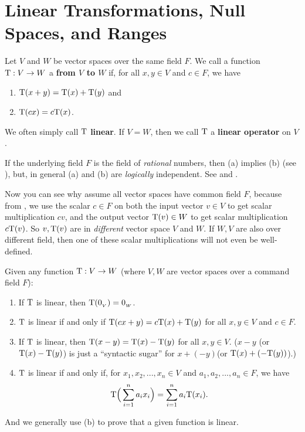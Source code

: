 \section{Linear Transformations, Null Spaces, and Ranges} \label{sec 2.1}

\begin{definition} \label{def 2.1}
Let \(V\) and \(W\) be vector spaces over the same field \(F\).
We call a function \(\mathrm{T}: V \to W\) a \textbf{\LTRAN{} from \(V\) to \(W\)} if, for all \(x, y \in V\) and \(c \in F\), we have
\begin{enumerate}
\item \(\mathrm{T}(x + y) = \mathrm{T}(x) + \mathrm{T}(y)\) and
\item \(\mathrm{T}(cx) = c\mathrm{T}(x)\).
\end{enumerate}
We often simply call \(\mathrm{T}\) \textbf{linear}.
If \(V = W\), then we call \(\mathrm{T}\) a \textbf{linear operator} on \(V\).
\end{definition}

\begin{remark} \label{remark 2.1.1}
If the underlying field \(F\) is the field of \emph{rational} numbers, then  (a) implies (b) (see ),
but, in general (a) and (b) are \emph{logically} independent.
See  and .
\end{remark}

\begin{remark} \label{remark 2.1.2}
Now you can see why  assume all vector spaces have common field \(F\), because from , we use the scalar \(c \in F\) on both the input vector \(v \in V\) to get scalar multiplication \(c v\), and the output vector \(\mathrm{T}(v) \in W\) to get scalar multiplication \(c \mathrm{T}(v)\).
So \(v, \mathrm{T}(v)\) are in \emph{different} vector space \(V\) and \(W\).
If \(W, V\) are also over different field, then one of these scalar multiplications will not even be well-defined.
\end{remark}

\begin{additional theorem} \label{athm 2.1}
Given any function \(\mathrm{T} : V \to W\) (where \(V, W\) are vector spaces over a command field \(F\)):
\begin{enumerate}
\item If \(\mathrm{T}\) is linear, then \(\mathrm{T}(0_{_V}) = 0_{_W}\).
\item \(\mathrm{T}\) is linear if and only if \(\mathrm{T}(cx + y) = c\mathrm{T}(x) + \mathrm{T}(y)\) for all \(x, y \in V\) and \(c \in F\).
\item If \(\mathrm{T}\) is linear, then \(\mathrm{T}(x - y) = \mathrm{T}(x) - \mathrm{T}(y)\) for all \(x, y \in V\).
    (\(x - y\) (or \(\mathrm{T}(x) - \mathrm{T}(y)\)) is just a ``syntactic sugar'' for \(x + (-y)\)(or \(\mathrm{T}(x) + (-\mathrm{T}(y))\)).)
\item \(\mathrm{T}\) is linear if and only if, for \(x_1, x_2, ..., x_n \in V\) and \(a_1, a_2, ..., a_n \in F\), we have
\[
    \mathrm{T} \Big( \sum_{i = 1}^{n} a_i x_i \Big) = \sum_{i = 1}^{n} a_i \mathrm{T}(x_i).
\]
\end{enumerate}
And we generally use (b) to prove that a given function is linear.
\end{additional theorem}

